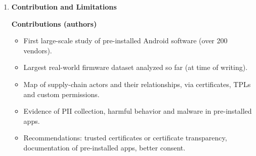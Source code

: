 \documentclass[11pt,a4paper]{article}
\newcommand{\entrypart}[1]{\textbf{\color{accent}#1}\par\vspace{2pt}}
\begin{document}
\begin{enumerate}
\begin{itemize}
        \item \textbf{Exported components:} 6,849 apps potentially expose at least one activity (166 vendors). 4,591 apps expose services (157 vendors). Top-10 vendors account for over 70\%.
        \item \textbf{Behaviors (static, $N = 3{,}154$):} contacts (164 apps), SMS contents (74), sending SMS (29), phone calls (339). About 25\% show at least 5 behaviors, almost 1\% show 20 or more.
        \item \textbf{Traffic:} of 3,118 apps with Internet permission, 1,055 had Lumen flows. 54,614 domains contacted, 7,629 belong to advertising and tracking services. Alphabet owns most.
        \item \textbf{Manual analysis (158 apps)}
        \begin{itemize}
            \item Known malware: Triada, Rootnik, SnowFox, Xinyin, Ztorg, Iop, GMobi. Some C2 servers still running.
            \item Redstone FOTA service: collects about 50 data items, silently installs packages, tracks user installs/removals.
            \item Adups FOTA app found in 55 brands.
            \item 612 apps with engineering/factory-mode functions. Some expose unprotected rooting (e.g., secret code \texttt{*\#*\#9527\#*\#*}).
        \end{itemize}
        \item \textbf{Consent:} of 6 new devices bought in Spain, 3 showed no privacy policy at all.
    \end{itemize}

    \item \entrypart{Contribution and Limitations}

    \textbf{Contributions (authors)}
    \begin{itemize}
        \item First large-scale study of pre-installed Android software (over 200 vendors).
        \item Largest real-world firmware dataset analyzed so far (at time of writing).
        \item Map of supply-chain actors and their relationships, via certificates, TPLs and custom permissions.
        \item Evidence of PII collection, harmful behavior and malware in pre-installed apps.
        \item Recommendations: trusted certificates or certificate transparency, documentation of pre-installed apps, better consent.
    \end{itemize}


\end{enumerate}
\end{document}
